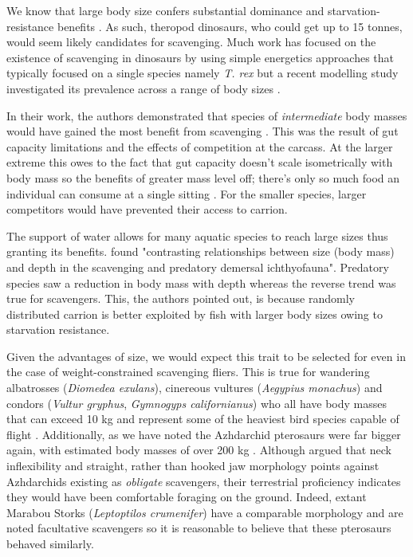 \documentclass[a4paper,12pt]{article}
\begin{document}
We know that large body size confers substantial dominance and starvation-resistance benefits \citep{ruxton2004obligate}. 
As such, theropod dinosaurs, who could get up to 15 tonnes, would seem likely candidates for scavenging. 
Much work has focused on the existence of scavenging in dinosaurs by using simple energetics approaches that typically focused on a single species namely \textit{T. rex} \citep{ruxton2003could,carbone2011intra} but a recent modelling study investigated its prevalence across a range of body sizes \citep{kane2016body}.

In their work, the authors demonstrated that species of \textit{intermediate} body masses would have gained the most benefit from scavenging \citep{kane2016body}.
This was the result of gut capacity limitations and the effects of competition at the carcass.
At the larger extreme this owes to the fact that gut capacity doesn't scale isometrically with body mass so the benefits of greater mass level off; there's only so much food an individual can consume at a single sitting \citep{calder1996size}.
For the smaller species, larger competitors would have prevented their access to carrion.

The support of water allows for many aquatic species to reach large sizes thus granting its benefits. 
\cite{collins2005trends} found "contrasting relationships between size (body mass) and depth in the scavenging and predatory demersal ichthyofauna". 
Predatory species saw a reduction in body mass with depth whereas the reverse trend was true for scavengers. 
This, the authors pointed out, is because randomly distributed carrion is better exploited by fish with larger body sizes owing to starvation resistance.  

Given the advantages of size, we would expect this trait to be selected for even in the case of weight-constrained scavenging fliers.
This is true for wandering albatrosses (\textit{Diomedea exulans}), cinereous vultures (\textit{Aegypius monachus}) and condors (\textit{Vultur gryphus}, \textit{Gymnogyps californianus}) who all have body masses that can exceed 10 kg and represent some of the heaviest bird species capable of flight \citep{weimerskirch1992reproductive,ferguson2001raptors,donazar2002effects}.
Additionally, as we have noted the Azhdarchid pterosaurs were far bigger again, with estimated body masses of over 200 kg \citep{witton2010size}.
Although \cite{witton2008reappraisal} argued that neck inflexibility and straight, rather than hooked jaw morphology points against Azhdarchids existing as \textit{obligate} scavengers, their terrestrial proficiency indicates they would have been comfortable foraging on the ground.
Indeed, extant Marabou Storks (\textit{Leptoptilos crumenifer}) have a comparable morphology and are noted facultative scavengers \citep{monadjem2012survival} so it is reasonable to believe that these pterosaurs behaved similarly.
 
\end{document}
